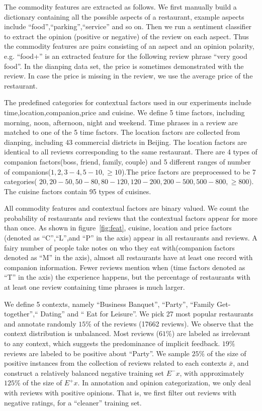 \documentclass[preprint,12pt]{elsarticle}
\begin{document}
The commodity features are extracted as follows. We first manually build a dictionary containing all the possible aspects of a restaurant, example aspects include ``food'',``parking'',``service'' and so on. Then we run a sentiment classifier~\cite{Liu2005Opinion} to extract the opinion (positive or negative) of the review on each aspect.  Thus the commodity features are pairs consisting of an aspect and an opinion polarity, e.g. ``food+'' is an extracted feature for the following review phrase ``very good food''. In the dianping data set, the price is sometimes demonstrated with the review. In case the price is missing in the review, we use the average price of the restaurant.

The predefined categories for contextual factors used in our experiments include time,location,companion,price and cuisine. We define 5 time factors, including morning, noon, afternoon, night and weekend. Time phrases in a review are matched to one of the 5 time factors. The location factors are collected from dianping, including 43 commercial districts in Beijing. The location factors are identical to all reviews corresponding to the same restaurant. There are 4 types of companion factors(boss, friend, family, couple) and 5 different ranges of number of companions($1,2,3-4,5-10,\geq 10$).The price factors are preprocessed to be 7 categories( $20,20-50,50-80,80-120,120-200,200-500,500-800,\geq 800$). The cuisine factors contain 95 types of cuisines.

All commodity features and contextual factors are binary valued. We count the probability of restaurants and reviews that the contextual factors appear for more than once. As shown in figure~\ref{fig:feat}, cuisine, location and price factors (denoted as ``C'',``L'',and ``P'' in the axis) appear in all restaurants and reviews. A fairy number of people take notes on who they eat with(companion factors denoted as ``M'' in the axis), almost all restaurants have at least one record with companion information. Fewer reviews mention when (time factors denoted as ``T'' in the axis) the experience happens, but the percentage of restaurants with at least one review containing time phrases is much larger.

We define 5 contexts, namely ``Business Banquet'', ``Party'', ``Family Get-together'',`` Dating'' and `` Eat for Leisure''. We pick 27 most popular restaurants and annotate randomly $15\%$ of the reviews (17662 reviews). We observe that the context distribution is unbalanced. Most reviews ($61\%$) are labeled as irrelevant to any context, which suggests the predominance of implicit feedback. $19\%$ reviews are labeled to be positive about  ``Party''. We sample $25\%$ of the size of positive instances from the collection of reviews related to each contexts $\bar{x}$, and construct a relatively balanced negative training set  $E^{-}{x}$, with approximately $125\%$ of the size of $E^{+}{x}$. In annotation and opinion categorization, we only deal with reviews with positive opinions. That is, we first filter out reviews with negative ratings, for a ``cleaner'' training set. 
\end{document}
